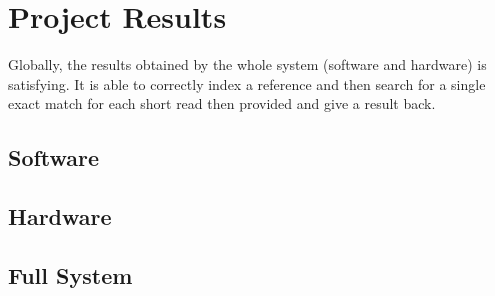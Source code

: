
\chapter{Project Results} %

\label{Chapter5} %


Globally, the results obtained by the whole system (software and hardware) is satisfying. It is able to correctly index a reference and then search for a single exact match for each short read then provided and give a result back. \\

\section{Software}

\section{Hardware}

\section{Full System}


